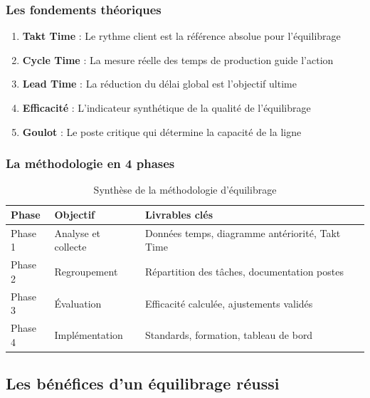 \documentclass[12pt,a4paper]{article}
\newenvironment{methodbox}[1]
  {\begin{tcolorbox}[colback=blue!5!white, colframe=methodcolor, title=#1]\small}
  {\end{tcolorbox}}
\begin{document}
\begin{center}
\subsubsection{Les fondements théoriques}

\begin{methodbox}{Points essentiels à retenir}
\begin{enumerate}
    \item \textbf{Takt Time} : Le rythme client est la référence absolue pour l'équilibrage
    \item \textbf{Cycle Time} : La mesure réelle des temps de production guide l'action
    \item \textbf{Lead Time} : La réduction du délai global est l'objectif ultime
    \item \textbf{Efficacité} : L'indicateur synthétique de la qualité de l'équilibrage
    \item \textbf{Goulot} : Le poste critique qui détermine la capacité de la ligne
\end{enumerate}
\end{methodbox}

\subsubsection{La méthodologie en 4 phases}

\begin{table}[H]
\centering
\begin{tabular}{|p{2.5cm}|p{3.5cm}|p{6cm}|}
\hline
\textbf{Phase} & \textbf{Objectif} & \textbf{Livrables clés} \\
\hline
Phase 1 & Analyse et collecte & Données temps, diagramme antériorité, Takt Time \\
\hline
Phase 2 & Regroupement & Répartition des tâches, documentation postes \\
\hline
Phase 3 & Évaluation & Efficacité calculée, ajustements validés \\
\hline
Phase 4 & Implémentation & Standards, formation, tableau de bord \\
\hline
\end{tabular}
\caption{Synthèse de la méthodologie d'équilibrage}
\end{table}

\subsection{Les bénéfices d'un équilibrage réussi}


\end{center}
\end{document}
